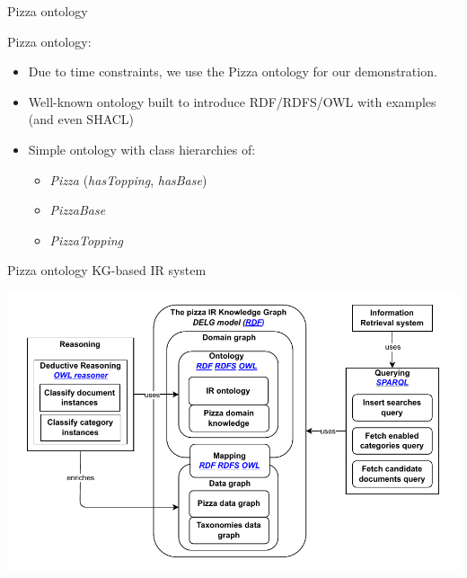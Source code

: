 \begin{frame}{Pizza ontology}

    Pizza ontology:
    \begin{itemize}
        \item Due to time constraints, we use the Pizza ontology for our demonstration.
        \item Well-known ontology built to introduce RDF/RDFS/OWL with examples (and even SHACL)
        \item Simple ontology with class hierarchies of:
        \begin{itemize}
            \item \emph{Pizza} (\emph{hasTopping}, \emph{hasBase})
            \item \emph{PizzaBase}
            \item \emph{PizzaTopping}
        \end{itemize} 
    \end{itemize}

\end{frame}

\begin{frame}{Pizza ontology KG-based IR system}

        \begin{center}
            \includegraphics[scale=0.65]{images/pizza-demo-kg.pdf} 
        \end{center}

\end{frame}

